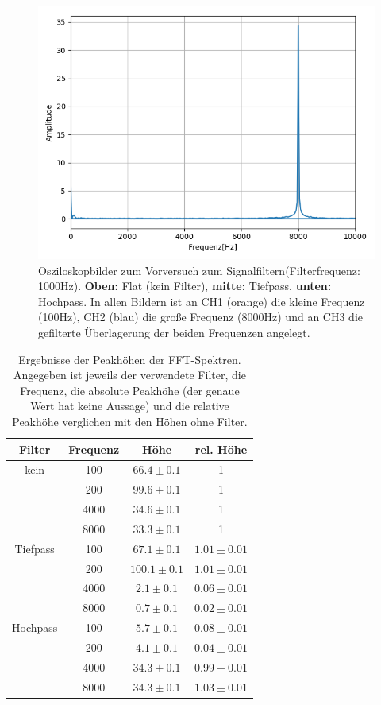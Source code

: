 \documentclass[12pt,a4paper]{article}
\begin{document}
\begin{figure}
\includegraphics[scale=0.5]{Bilder/Vorversuch3/Vor3_5.png}
\caption{Osziloskopbilder zum Vorversuch zum Signalfiltern(Filterfrequenz: 1000Hz). \textbf{Oben:} Flat (kein Filter), \textbf{mitte:} Tiefpass, \textbf{unten:} Hochpass.
In allen Bildern ist an CH1 (orange) die kleine Frequenz (100Hz), CH2 (blau) die große Frequenz (8000Hz) und an CH3 die gefilterte Überlagerung der beiden Frequenzen angelegt.}
\label{fig:Vor3_Oszi2}
\end{figure}

\begin{table}
\centering
\begin{tabular}{|c|c|c|c|}
\hline
Filter & Frequenz & Höhe & rel. Höhe\\
\hline
kein & 100 & $66.4\pm 0.1$ & 1\\
\cline{2-4}
& 200 & $99.6\pm 0.1$ & 1\\
\cline{2-4}
& 4000 & $34.6\pm 0.1$ & 1\\
\cline{2-4}
& 8000 & $33.3\pm 0.1$ & 1\\
\hline
\hline
Tiefpass & 100 & $67.1\pm 0.1$ & $1.01\pm 0.01$\\
\cline{2-4}
& 200 & $100.1\pm 0.1$ & $1.01\pm 0.01$\\
\cline{2-4}
& 4000 & $2.1\pm 0.1$ & $0.06\pm 0.01$\\
\cline{2-4}
& 8000 & $0.7\pm 0.1$ & $0.02\pm 0.01$\\
\hline
\hline
Hochpass & 100 & $5.7\pm 0.1$ & $0.08\pm 0.01$\\
\cline{2-4}
& 200 & $4.1\pm 0.1$ & $0.04\pm 0.01$\\
\cline{2-4}
& 4000 & $34.3\pm 0.1$ & $0.99\pm 0.01$\\
\cline{2-4}
& 8000 & $34.3\pm 0.1$ & $1.03\pm 0.01$\\
\hline
\end{tabular} 
\caption{Ergebnisse der Peakhöhen der FFT-Spektren. Angegeben ist jeweils der verwendete Filter, die Frequenz, die absolute Peakhöhe (der genaue Wert hat keine Aussage) und die relative Peakhöhe verglichen mit den Höhen ohne Filter.}
\label{tab:Peakhohen}
\end{table}
\end{document}
